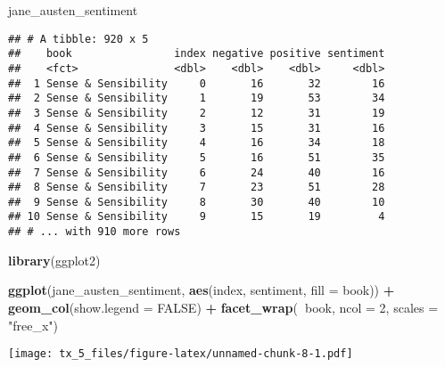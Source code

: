 \documentclass[]{article}
\newenvironment{Shaded}{\begin{snugshade}}{\end{snugshade}}
\newcommand{\KeywordTok}[1]{\textcolor[rgb]{0.13,0.29,0.53}{\textbf{#1}}}
\newcommand{\DataTypeTok}[1]{\textcolor[rgb]{0.13,0.29,0.53}{#1}}
\newcommand{\DecValTok}[1]{\textcolor[rgb]{0.00,0.00,0.81}{#1}}
\newcommand{\StringTok}[1]{\textcolor[rgb]{0.31,0.60,0.02}{#1}}
\newcommand{\OtherTok}[1]{\textcolor[rgb]{0.56,0.35,0.01}{#1}}
\newcommand{\OperatorTok}[1]{\textcolor[rgb]{0.81,0.36,0.00}{\textbf{#1}}}
\newcommand{\NormalTok}[1]{#1}
\begin{document}
\begin{Shaded}
\begin{Highlighting}[]
\NormalTok{jane_austen_sentiment}
\end{Highlighting}
\end{Shaded}

\begin{verbatim}
## # A tibble: 920 x 5
##    book                index negative positive sentiment
##    <fct>               <dbl>    <dbl>    <dbl>     <dbl>
##  1 Sense & Sensibility     0       16       32        16
##  2 Sense & Sensibility     1       19       53        34
##  3 Sense & Sensibility     2       12       31        19
##  4 Sense & Sensibility     3       15       31        16
##  5 Sense & Sensibility     4       16       34        18
##  6 Sense & Sensibility     5       16       51        35
##  7 Sense & Sensibility     6       24       40        16
##  8 Sense & Sensibility     7       23       51        28
##  9 Sense & Sensibility     8       30       40        10
## 10 Sense & Sensibility     9       15       19         4
## # ... with 910 more rows
\end{verbatim}

\begin{Shaded}
\begin{Highlighting}[]
\KeywordTok{library}\NormalTok{(ggplot2)}

\KeywordTok{ggplot}\NormalTok{(jane_austen_sentiment, }\KeywordTok{aes}\NormalTok{(index, sentiment, }\DataTypeTok{fill =}\NormalTok{ book)) }\OperatorTok{+}
\StringTok{  }\KeywordTok{geom_col}\NormalTok{(}\DataTypeTok{show.legend =} \OtherTok{FALSE}\NormalTok{) }\OperatorTok{+}
\StringTok{  }\KeywordTok{facet_wrap}\NormalTok{(}\OperatorTok{~}\NormalTok{book, }\DataTypeTok{ncol =} \DecValTok{2}\NormalTok{, }\DataTypeTok{scales =} \StringTok{"free_x"}\NormalTok{)}
\end{Highlighting}
\end{Shaded}

\texttt{[image: tx\_5\_files/figure-latex/unnamed-chunk-8-1.pdf]}

\begin{Shaded}
\end{Shaded}
\end{document}
